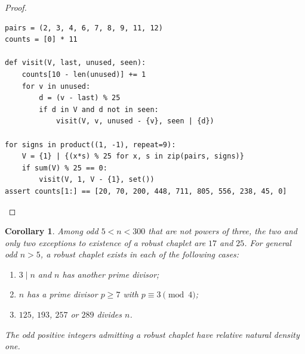 \documentclass[11pt,a4paper]{article}
\newtheorem{corollary}[theorem]{Corollary}
\begin{document}
\begin{proof}
\begin{verbatim}
pairs = (2, 3, 4, 6, 7, 8, 9, 11, 12)
counts = [0] * 11

def visit(V, last, unused, seen):
    counts[10 - len(unused)] += 1
    for v in unused:
        d = (v - last) % 25
        if d in V and d not in seen:
            visit(V, v, unused - {v}, seen | {d})

for signs in product((1, -1), repeat=9):
    V = {1} | {(x*s) % 25 for x, s in zip(pairs, signs)}
    if sum(V) % 25 == 0:
        visit(V, 1, V - {1}, set())
assert counts[1:] == [20, 70, 200, 448, 711, 805, 556, 238, 45, 0]
\end{verbatim}
\end{proof}

\begin{corollary}\label{cor:robust}
Among odd $5<n<300$ that are not powers of three, the two and only two exceptions to existence of a robust chaplet are $17$ and $25$. For general odd $n>5$, a robust chaplet exists in each of the following cases:
\begin{enumerate}[label=(\alph*),nosep]
\item $3\mid n$ and $n$ has another prime divisor;
\item $n$ has a prime divisor $p\ge7$ with $p\equiv3\pmod4$;
\item $125$, $193$, $257$ or $289$ divides $n$.
\end{enumerate}
The odd positive integers admitting a robust chaplet have relative natural density one.
\end{corollary}
\end{document}
